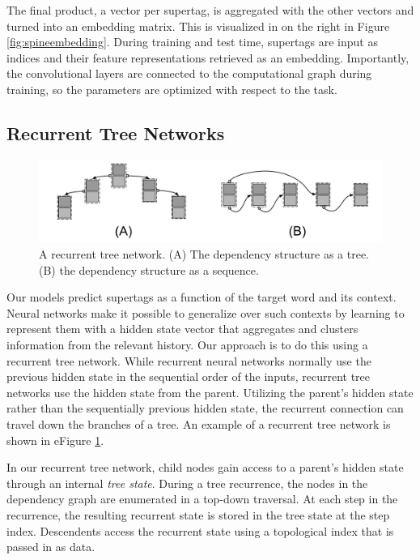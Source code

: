\documentclass[11pt]{article}
\begin{document}
The final product, a vector per supertag, is aggregated with the other vectors
and turned into an embedding matrix.
%
This is visualized in on the right in Figure \ref{fig:spineembedding}.
%
During training and test time, supertags are input as indices and their feature
representations retrieved as an embedding.
%
Importantly, the convolutional layers are connected to the computational graph during training, so the parameters are optimized with respect to the task.


\subsection{Recurrent Tree Networks}
\label{subsec:rtn}

\begin{figure}[tH!]
\centering
\includegraphics[width=\textwidth]{rtn.pdf}
\caption{A recurrent tree network. (A) The dependency structure as a tree.  (B) the dependency structure as a sequence.}
 \label{fig:rtn}
\end{figure}

Our models predict supertags as a function of the target word and its
context.  Neural networks make it possible to generalize over such
contexts by learning to represent them with a hidden state vector that
aggregates and clusters information from the relevant history.  Our
approach is to do this using a recurrent tree network.
%
While recurrent neural networks normally use the previous hidden state in the sequential order of the inputs,
recurrent tree networks use the hidden state from the parent.
%
Utilizing the parent's hidden state rather than the sequentially previous hidden
state, the recurrent connection can travel down the branches of a tree.
%
An example of a recurrent tree network is shown in eFigure \ref{fig:rtn}.



In our recurrent tree network, child nodes gain access to a parent's hidden state
through an internal \emph{tree state}.
%
During a tree recurrence, the nodes in the dependency graph are enumerated in a
top-down traversal.
%
At each step in the recurrence, the resulting recurrent state is stored in the
tree state at the step index.
%
Descendents access the recurrent state using a topological index that is passed in as data.
\end{document}
